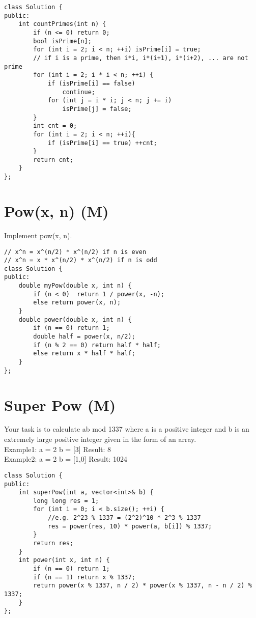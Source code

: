 \begin{lstlisting}
class Solution {
public:
    int countPrimes(int n) {
        if (n <= 0) return 0;
        bool isPrime[n];
        for (int i = 2; i < n; ++i) isPrime[i] = true;
        // if i is a prime, then i*i, i*(i+1), i*(i+2), ... are not prime
        for (int i = 2; i * i < n; ++i) {
            if (isPrime[i] == false)    
                continue;
            for (int j = i * i; j < n; j += i)  
                isPrime[j] = false;
        }
        int cnt = 0;
        for (int i = 2; i < n; ++i){
            if (isPrime[i] == true) ++cnt;
        }
        return cnt;
    }
};
\end{lstlisting}


\section{Pow(x, n) (M)}
Implement pow(x, n). \\

\begin{lstlisting}
// x^n = x^(n/2) * x^(n/2) if n is even
// x^n = x * x^(n/2) * x^(n/2) if n is odd
class Solution {
public:
    double myPow(double x, int n) {
        if (n < 0)  return 1 / power(x, -n);
        else return power(x, n);
    }
    double power(double x, int n) {
        if (n == 0) return 1;
        double half = power(x, n/2);
        if (n % 2 == 0) return half * half;
        else return x * half * half;
    }
};
\end{lstlisting}


\section{Super Pow (M)}
Your task is to calculate ab mod 1337 where a is a positive integer and b is an extremely large positive integer given in the form of an array. \\
 
Example1:
a = 2
b = [3]
Result: 8\\

Example2:
a = 2
b = [1,0]
Result: 1024\\

\begin{lstlisting}
class Solution {
public:
    int superPow(int a, vector<int>& b) {
        long long res = 1;
        for (int i = 0; i < b.size(); ++i) {
            //e.g. 2^23 % 1337 = (2^2)^10 * 2^3 % 1337
            res = power(res, 10) * power(a, b[i]) % 1337;
        }
        return res;
    }
    int power(int x, int n) {
        if (n == 0) return 1;
        if (n == 1) return x % 1337;
        return power(x % 1337, n / 2) * power(x % 1337, n - n / 2) % 1337;
    }
};
\end{lstlisting}


